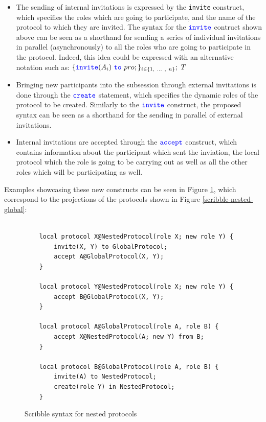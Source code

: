 \documentclass[12pt,twoside]{report}
\begin{document}
\begin{itemize}
    \item The sending of internal invitations is expressed by the \texttt{invite} construct, which specifies the roles which are going to participate, and the name of the protocol to which they are invited. The syntax for the ${\color{blue}\mathtt{invite}}$ contruct shown above can be seen as a shorthand for sending a series of individual invitations in parallel (asynchronously) to all the roles who are going to participate in the protocol. Indeed, this idea could be expressed with an alternative notation such as:
    $\{\invite(A_i)\ \scrto\ pro;\}_{i \in \{1,\ ...\ ,\ n\}};\ T$

    \item Bringing new participants into the subsession through external invitations is done through the ${\color{blue}\mathtt{create}}$ statement, which specifies the dynamic roles of the protocol to be created. Similarly to the ${\color{blue}\mathtt{invite}}$ construct, the proposed syntax can be seen as a shorthand for the sending in parallel of external invitations.
    
    \item Internal invitations are accepted through the ${\color{blue}\mathtt{accept}}$ construct, which contains information about the participant which sent the inviation, the local protocol which the role is going to be carrying out as well as all the other roles which will be participating as well.
\end{itemize}

Examples showcasing these new constructs can be seen in Figure \ref{scribble-nested-local}, which correspond to the projections of the protocols shown in Figure \ref{scribble-nested-global}:

\begin{figure}[htb!]
    \centering
    \lstset{language=Scribble}
    \begin{lstlisting}
    
    local protocol X@NestedProtocol(role X; new role Y) {
        invite(X, Y) to GlobalProtocol;
        accept A@GlobalProtocol(X, Y);
    }

    local protocol Y@NestedProtocol(role X; new role Y) {
        accept B@GlobalProtocol(X, Y);
    }
    
    local protocol A@GlobalProtocol(role A, role B) {
        accept X@NestedProtocol(A; new Y) from B;
    }

    local protocol B@GlobalProtocol(role A, role B) {
        invite(A) to NestedProtocol;
        create(role Y) in NestedProtocol;
    }
    \end{lstlisting}
    \caption{Scribble syntax for nested protocols}
    \label{scribble-nested-local}
\end{figure}{}
\end{document}
